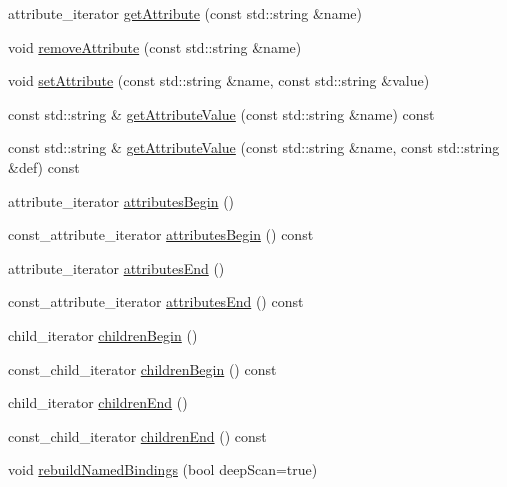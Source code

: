 \begin{DoxyCompactItemize}
\item 
attribute\+\_\+iterator \hyperlink{classXMLDOM_1_1XMLElement_a24561b966a6840413b4804fddede2011}{get\+Attribute} (const std\+::string \&name)
\item 
void \hyperlink{classXMLDOM_1_1XMLElement_a8d47de14572108518a19abdf074c7b83}{remove\+Attribute} (const std\+::string \&name)
\item 
void \hyperlink{classXMLDOM_1_1XMLElement_a28140b3cd726d36930ae1d59d258fa04}{set\+Attribute} (const std\+::string \&name, const std\+::string \&value)
\item 
const std\+::string \& \hyperlink{classXMLDOM_1_1XMLElement_a5d09435a6f8e608a9d4c2bae19701fd0}{get\+Attribute\+Value} (const std\+::string \&name) const 
\item 
const std\+::string \& \hyperlink{classXMLDOM_1_1XMLElement_a421fe7112187db26d6c8529a2af3187a}{get\+Attribute\+Value} (const std\+::string \&name, const std\+::string \&def) const 
\item 
attribute\+\_\+iterator \hyperlink{classXMLDOM_1_1XMLElement_af5535e7b15134b7f780a19a62852f0b8}{attributes\+Begin} ()
\item 
const\+\_\+attribute\+\_\+iterator \hyperlink{classXMLDOM_1_1XMLElement_ace8e37dfd5644c9a4f94cf99d74bcc76}{attributes\+Begin} () const 
\item 
attribute\+\_\+iterator \hyperlink{classXMLDOM_1_1XMLElement_aa89a2b2409bd1a55d0e4f0644f530d8d}{attributes\+End} ()
\item 
const\+\_\+attribute\+\_\+iterator \hyperlink{classXMLDOM_1_1XMLElement_ae8bdc3b87c921fbbda7593bdc3c84320}{attributes\+End} () const 
\item 
child\+\_\+iterator \hyperlink{classXMLDOM_1_1XMLElement_aabdd3c93fc39142e773ed65c42fbcfb0}{children\+Begin} ()
\item 
const\+\_\+child\+\_\+iterator \hyperlink{classXMLDOM_1_1XMLElement_aea217caa9f1395f4c80a5a3766ac30f9}{children\+Begin} () const 
\item 
child\+\_\+iterator \hyperlink{classXMLDOM_1_1XMLElement_a95d33e72e4dd9a7b1a6ad3bb26053777}{children\+End} ()
\item 
const\+\_\+child\+\_\+iterator \hyperlink{classXMLDOM_1_1XMLElement_a535aa02187cf032bea6dc26b85e29179}{children\+End} () const 
\item 
void \hyperlink{classXMLDOM_1_1XMLElement_a2ea0c98e68c76b1777e85d869af9733b}{rebuild\+Named\+Bindings} (bool deep\+Scan=true)
\end{DoxyCompactItemize}
